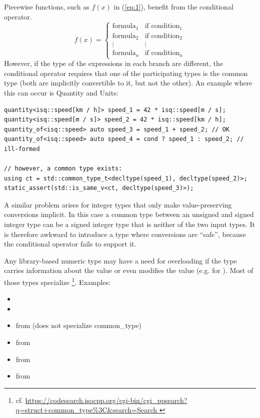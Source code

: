Piecewise functions, such as $f(x)$ in (\ref{eq:1}), benefit from the conditional operator.
\begin{equation}
  f(x) = \begin{cases}
    \text{formula}_1 & \text{if } \text{condition}_1 \\
    \text{formula}_2 & \text{if } \text{condition}_2 \\
    \vdots & \vdots \\
    \text{formula}_n & \text{if } \text{condition}_n
  \end{cases}
  \label{eq:1}
\end{equation}
However, if the type of the expressions in each branch are different, the conditional operator requires that one of the participating types is the common type (both are implicitly convertible to it, but not the other).
An example where this can occur is Quantity and Units:
\smallskip\begin{lstlisting}
quantity<isq::speed[km / h]> speed_1 = 42 * isq::speed[m / s];
quantity<isq::speed[m / s]> speed_2 = 42 * isq::speed[km / h];
quantity_of<isq::speed> auto speed_3 = speed_1 + speed_2; // OK
quantity_of<isq::speed> auto speed_4 = cond ? speed_1 : speed_2; // ill-formed

// however, a common type exists:
using ct = std::common_type_t<decltype(speed_1), decltype(speed_2)>;
static_assert(std::is_same_v<ct, decltype(speed_3)>);
\end{lstlisting}

A similar problem arises for integer types that only make value-preserving conversions implicit.
In this case a common type between an unsigned and signed integer type can be a signed integer type that is neither of the two input types.
It is therefore awkward to introduce a type where conversions are “safe”, because the conditional operator fails to support it.

Any library-based numeric type may have a need for overloading  if the type carries information about the value or even modifies the value (e.g. for ).
Most of those types specialize \footnote{cf. \url{https://codesearch.isocpp.org/cgi-bin/cgi_ppsearch?q=struct+common_type\%3C&search=Search
}}.
Examples:
\begin{itemize}
  \item {}
  \item {}
  \item {} from \textcite{P1438R1} (does not specialize common_type)
  \item {} from \textcite{P1050R0}
  \item {} from \textcite{P0037R5}
  \item {} from \textcite{site.bounded-integer}
\end{itemize}

